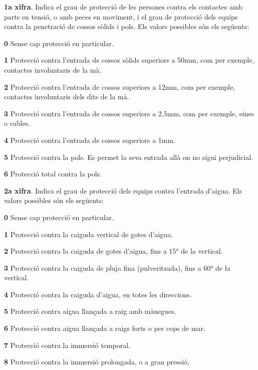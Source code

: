 \textbf{1a xifra}. Indica el grau de protecci\'{o} de les persones contra els contactes amb
parts en tensi\'{o}, o amb peces en moviment, i el grau de protecci\'{o} dels equips contra la
penetraci\'{o} de cossos s\`{o}lids i pols. Els valors possibles s\'{o}n els seg\"{u}ents:
\begin{list}{}
   {\setlength{\labelwidth}{10mm} \setlength{\leftmargin}{10mm} \setlength{\labelsep}{2mm}}
   \item[\textbf{0}] Sense cap protecci\'{o} en particular.
   \item[\textbf{1}] Protecci\'{o} contra l'entrada de cossos s\`{o}lids superiors a 50\unit{mm},
   com per exemple,   contactes involuntaris de la m\`{a}.
   \item[\textbf{2}] Protecci\'{o} contra l'entrada de cossos superiors a 12\unit{mm}, com per exemple,
   contactes involuntaris dels dits de la m\`{a}.
   \item[\textbf{3}] Protecci\'{o} contra l'entrada de cossos superiors a 2,5\unit{mm},
   com per exemple, eines o cables.
   \item[\textbf{4}] Protecci\'{o} contra l'entrada de cossos superiors a 1\unit{mm}.
   \item[\textbf{5}] Protecci\'{o} contra la pols. Es permet la seva entrada all\`{a} on no sigui perjudicial.
   \item[\textbf{6}] Protecci\'{o} total contra la pols.
\end{list}

\textbf{2a xifra}. Indica el grau de protecci\'{o} dels equips contra
l'entrada d'aigua. Els valors possibles s\'{o}n els seg\"{u}ents:
\begin{list}{}
   {\setlength{\labelwidth}{10mm} \setlength{\leftmargin}{10mm} \setlength{\labelsep}{2mm}}
   \item[\textbf{0}] Sense cap protecci\'{o} en particular.
   \item[\textbf{1}] Protecci\'{o} contra la caiguda vertical de gotes d'aigua.
   \item[\textbf{2}] Protecci\'{o} contra la caiguda de gotes d'aigua, fins a 15\unit{\degree} de la  vertical.
   \item[\textbf{3}] Protecci\'{o} contra la caiguda de pluja fina (pulveritzada), fins a 60\unit{\degree} de la  vertical.
   \item[\textbf{4}] Protecci\'{o} contra la caiguda d'aigua, en totes les direccions.
   \item[\textbf{5}] Protecci\'{o} contra aigua llan\c{c}ada a raig amb m\`{a}negues.
   \item[\textbf{6}] Protecci\'{o} contra aigua llan\c{c}ada a raigs forts o per cops de mar.
   \item[\textbf{7}] Protecci\'{o} contra la immersi\'{o} temporal.
   \item[\textbf{8}] Protecci\'{o} contra la immersi\'{o} prolongada, o a gran pressi\'{o}.
\end{list}


